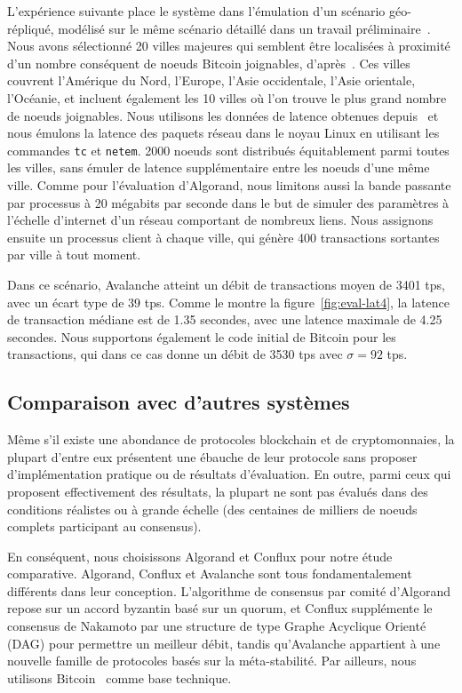L'expérience suivante place le système dans l'émulation d'un scénario géo-répliqué, modélisé sur le même scénario
détaillé dans un travail préliminaire~\cite{GiladHMVZ17}.
Nous avons sélectionné 20 villes majeures qui semblent être localisées à proximité d'un nombre conséquent de noeuds
Bitcoin joignables, d'après~\cite{bitnodes2018}. Ces villes couvrent l'Amérique du Nord, l'Europe, l'Asie occidentale,
l'Asie orientale, l'Océanie, et incluent également les 10 villes où l'on trouve le plus grand nombre de noeuds
joignables. Nous utilisons les données de latence obtenues depuis~\cite{wondernetworkping2018} et nous émulons
la latence des paquets réseau dans le noyau Linux en utilisant les commandes \texttt{tc} et \texttt{netem}.
2000 noeuds sont distribués équitablement parmi toutes les villes, sans émuler de latence supplémentaire entre les
noeuds d'une même ville. Comme pour l'évaluation d'Algorand, nous limitons aussi la bande passante par processus
à 20 mégabits par seconde dans le but de simuler des paramètres à l'échelle d'internet d'un réseau comportant de
nombreux liens. Nous assignons ensuite un processus client à chaque ville, qui génère 400 transactions sortantes
par ville à tout moment.

Dans ce scénario, Avalanche atteint un débit de transactions moyen de 3401 tps, avec un écart type de 39 tps. Comme
le montre la figure~\ref{fig:eval-lat4}, la latence de transaction médiane est de 1.35 secondes, avec une latence
maximale de 4.25 secondes. Nous supportons également le code initial de Bitcoin pour les transactions, qui dans ce
cas donne un débit de 3530 tps avec $\sigma = 92$ tps.

\subsection{Comparaison avec d'autres systèmes}

Même s'il existe une abondance de protocoles blockchain et de cryptomonnaies, la plupart d'entre eux présentent
une ébauche de leur protocole sans proposer d'implémentation pratique ou de résultats d'évaluation. En outre, parmi
ceux qui proposent effectivement des résultats, la plupart ne sont pas évalués dans des conditions réalistes ou à
grande échelle (des centaines de milliers de noeuds complets participant au consensus).

En conséquent, nous choisissons Algorand et Conflux pour notre étude comparative. Algorand, Conflux et Avalanche
sont tous fondamentalement différents dans leur conception. L'algorithme de consensus par comité
d'Algorand repose sur un accord byzantin basé sur un quorum, et Conflux supplémente le consensus de Nakamoto par une
structure de type Graphe Acyclique Orienté (DAG) pour permettre un meilleur débit, tandis qu'Avalanche appartient à
une nouvelle famille de protocoles basés sur la méta-stabilité. Par ailleurs, nous utilisons
Bitcoin~\cite{nakamoto2008bitcoin} comme base technique.

